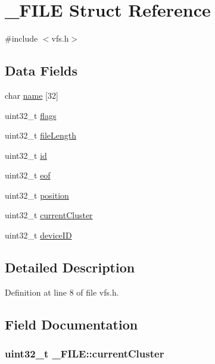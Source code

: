 \hypertarget{struct__FILE}{}\section{\+\_\+\+F\+I\+LE Struct Reference}
\label{struct__FILE}


{\ttfamily \#include $<$vfs.\+h$>$}

\subsection*{Data Fields}
\begin{DoxyCompactItemize}
\item 
char \hyperlink{struct__FILE_a8b3af56d97e2466fd17f621e858f5997}{name} \mbox{[}32\mbox{]}
\item 
uint32\+\_\+t \hyperlink{struct__FILE_a04f8186df85989c0b4bcdb010c1f5bb6}{flags}
\item 
uint32\+\_\+t \hyperlink{struct__FILE_a3bc033e1420b222573c83e7305c0a8e1}{file\+Length}
\item 
uint32\+\_\+t \hyperlink{struct__FILE_a72ed78f2e1d6b6fb661c1cb69ff288c7}{id}
\item 
uint32\+\_\+t \hyperlink{struct__FILE_a9fece9dca128f88e081a2f9d879b5a70}{eof}
\item 
uint32\+\_\+t \hyperlink{struct__FILE_a01f2ebf13d03e5fca5db23156b4a10c4}{position}
\item 
uint32\+\_\+t \hyperlink{struct__FILE_a01dafa6a663b0705884e39c397706874}{current\+Cluster}
\item 
uint32\+\_\+t \hyperlink{struct__FILE_a81958585561000f4b18409bf81c06755}{device\+ID}
\end{DoxyCompactItemize}


\subsection{Detailed Description}


Definition at line 8 of file vfs.\+h.



\subsection{Field Documentation}
\subsubsection[{\texorpdfstring{current\+Cluster}{currentCluster}}]{\setlength{\rightskip}{0pt plus 5cm}uint32\+\_\+t \+\_\+\+F\+I\+L\+E\+::current\+Cluster}\hypertarget{struct__FILE_a01dafa6a663b0705884e39c397706874}{}\label{struct__FILE_a01dafa6a663b0705884e39c397706874}


